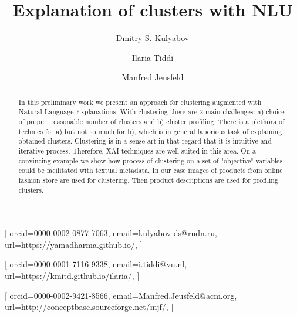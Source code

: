 \documentclass[
]{ceurart}
\begin{document}


\title{Explanation of clusters with NLU}

\tnotemark[1]

\author[1,2]{Dmitry S. Kulyabov}[%
orcid=0000-0002-0877-7063,
email=kulyabov-ds@rudn.ru,
url=https://yamadharma.github.io/,
]
\cormark[1]
\fnmark[1]
\address[1]{Peoples' Friendship University of Russia (RUDN University),
  6 Miklukho-Maklaya St, Moscow, 117198, Russian Federation}
\address[2]{Joint Institute for Nuclear Research,
  6 Joliot-Curie, Dubna, Moscow region, 141980, Russian Federation}

\author[3]{Ilaria Tiddi}[%
orcid=0000-0001-7116-9338,
email=i.tiddi@vu.nl,
url=https://kmitd.github.io/ilaria/,
]
\fnmark[1]
\address[3]{Vrije Universiteit Amsterdam, De Boelelaan 1105, 1081 HV Amsterdam, The Netherlands}

\author[4]{Manfred Jeusfeld}[%
orcid=0000-0002-9421-8566,
email=Manfred.Jeusfeld@acm.org,
url=http://conceptbase.sourceforge.net/mjf/,
]
\fnmark[1]
\address[4]{University of Skövde, Högskolevägen 1, 541 28 Skövde, Sweden}


\begin{abstract}
  In this preliminary work we present an approach for clustering augmented with Natural Language Explanations.
  With clustering there are 2 main challenges: a) choice of proper, reasonable number of clusters and b) cluster profiling.
  There is a plethora of technics for a) but not so much for b), which is in general laborious task of explaining obtained clusters.
  Clustering is in a sense art in that regard that it is intuitive and iterative process.
  Therefore, XAI techniques are well suited in this area.
  On a convincing example we show how process of clustering on a set of "objective" variables could be facilitated with textual metadata.
  In our case images of products from online fashion store are used for clustering.
  Then product descriptions are used for profiling clusters.
\end{abstract}
\end{document}
